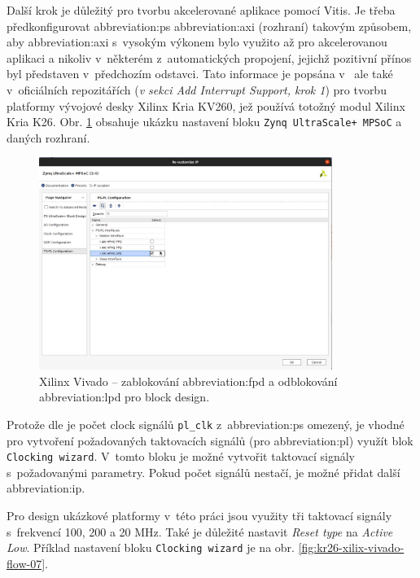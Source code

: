 \documentclass[a4paper, twoside, 11pt]{article}
\begin{document}
				Další krok je důležitý pro tvorbu akcelerované aplikace pomocí Vitis. Je třeba předkonfigurovat \gls{abbreviation:ps} \gls{abbreviation:axi} (rozhraní) takovým způsobem, aby \gls{abbreviation:axi} s~vysokým výkonem bylo využito až pro akcelerovanou aplikaci a nikoliv v~některém z~automatických propojení, jejichž pozitivní přínos byl představen v~předchozím odstavci. Tato informace je popsána v~\cite{hackster-getting-started-with-the-kria-kr260-in-vivado} ale také v~oficiálních repozitářích \cite{xilinx-github-vitis-tutorials-step-1-create-the-vivado-hardware-design-and-generate-xsa} (\textit{v sekci Add Interrupt Support, krok 1}) pro tvorbu platformy vývojové desky Xilinx Kria KV260, jež používá totožný modul Xilinx Kria K26. Obr. \ref{fig:kr26-xilix-vivado-flow-06} obsahuje ukázku nastavení bloku \texttt{Zynq UltraScale+ MPSoC} a daných rozhraní.

				\begin{figure}[htbp!]
					\centering
					\includegraphics[width=0.85\textwidth]{src/png/kr26-xilinx-vivado-flow/kr26-xilix-vivado-flow-06.jpg}
					\caption{Xilinx Vivado – zablokování \gls{abbreviation:fpd} a odblokování \gls{abbreviation:lpd} pro block design.}
					\label{fig:kr26-xilix-vivado-flow-06}
				\end{figure}

				Protože dle \cite{xilinx-github-vitis-tutorials-step-1-create-the-vivado-hardware-design-and-generate-xsa} je počet clock signálů \texttt{pl\_clk} z~\gls{abbreviation:ps} omezený, je vhodné pro vytvoření požadovaných taktovacích signálů (pro \gls{abbreviation:pl}) využít blok \texttt{Clocking wizard}. V~tomto bloku je možné vytvořit taktovací signály s~požadovanými parametry. Pokud počet signálů nestačí, je možné přidat další \gls{abbreviation:ip}.\par
				Pro design ukázkové platformy v~této práci jsou využity tři taktovací signály s~frekvencí 100, 200 a 20 MHz. Také je důležité nastavit \textit{Reset type} na \textit{Active Low}. Příklad nastavení bloku \texttt{Clocking wizard} je na obr. \ref{fig:kr26-xilix-vivado-flow-07}.\par
\end{document}
